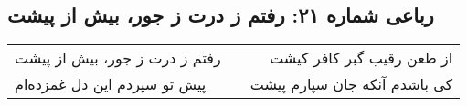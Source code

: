 \begin{center}
\section*{رباعی شماره ۲۱: رفتم ز درت ز جور، بیش از پیشت}
\label{sec:021}
\begin{longtable}{l p{0.5cm} r}
رفتم ز درت ز جور، بیش از پیشت
&&
از طعن رقیب گبر کافر کیشت
\\
پیش تو سپردم این دل غمزده‌ام
&&
کی باشدم آنکه جان سپارم پیشت
\\
\end{longtable}
\end{center}
